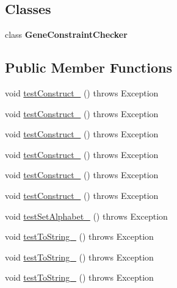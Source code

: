 \subsection*{Classes}
\begin{DoxyCompactItemize}
\item 
class {\bfseries Gene\-Constraint\-Checker}
\end{DoxyCompactItemize}
\subsection*{Public Member Functions}
\begin{DoxyCompactItemize}
\item 
void \hyperlink{classorg_1_1jgap_1_1impl_1_1_string_gene_test_ae8bb5d865e8ef909d6e94760806927ff}{test\-Construct\-\_} ()  throws Exception 
\item 
void \hyperlink{classorg_1_1jgap_1_1impl_1_1_string_gene_test_a54b1de2de97af66f8c5e46f334027238}{test\-Construct\-\_} ()  throws Exception 
\item 
void \hyperlink{classorg_1_1jgap_1_1impl_1_1_string_gene_test_afed8d34839f0c359f41f1ce962cc85d7}{test\-Construct\-\_} ()  throws Exception 
\item 
void \hyperlink{classorg_1_1jgap_1_1impl_1_1_string_gene_test_adff3a451bf73f01e9d48b22975e8002a}{test\-Construct\-\_} ()  throws Exception 
\item 
void \hyperlink{classorg_1_1jgap_1_1impl_1_1_string_gene_test_af2ce746b6f63849c5f017ad5a8f641a8}{test\-Construct\-\_} ()  throws Exception 
\item 
void \hyperlink{classorg_1_1jgap_1_1impl_1_1_string_gene_test_ad897af1103ed762775e94af89480c690}{test\-Construct\-\_} ()  throws Exception 
\item 
void \hyperlink{classorg_1_1jgap_1_1impl_1_1_string_gene_test_a19e452dd615a37f0626bec57b4d56be5}{test\-Set\-Alphabet\-\_} ()  throws Exception 
\item 
void \hyperlink{classorg_1_1jgap_1_1impl_1_1_string_gene_test_ac8d853a768b02052b1aebd97cb0fcc5c}{test\-To\-String\-\_} ()  throws Exception 
\item 
void \hyperlink{classorg_1_1jgap_1_1impl_1_1_string_gene_test_a1615a7798bb6cf39488e21af64f13f43}{test\-To\-String\-\_} ()  throws Exception 
\item 
void \hyperlink{classorg_1_1jgap_1_1impl_1_1_string_gene_test_add25caa09bc0485bfa00253ae6169f96}{test\-To\-String\-\_} ()  throws Exception 
\item 

\end{DoxyCompactItemize}
